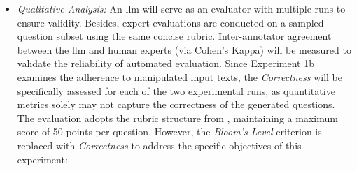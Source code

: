 \begin{itemize}
\begin{itemize}
        \item \textit{Qualitative Analysis:} An \ac{llm} will serve as an evaluator with multiple runs to ensure validity. Besides, expert evaluations are conducted on a sampled question subset using the same concise rubric. Inter-annotator agreement between the \ac{llm} and human experts (via Cohen's Kappa) will be measured to validate the reliability of automated evaluation. Since Experiment 1b examines the adherence to manipulated input texts, the \textit{Correctness} will be specifically assessed for each of the two experimental runs, as quantitative metrics solely may not capture the correctness of the generated questions. The evaluation adopts the rubric structure from \cite{mi_comparative_2024}, maintaining a maximum score of 50 points per question. However, the \textit{Bloom's Level} criterion is replaced with \textit{Correctness} to address the specific objectives of this experiment:


\end{itemize}
\end{itemize}
